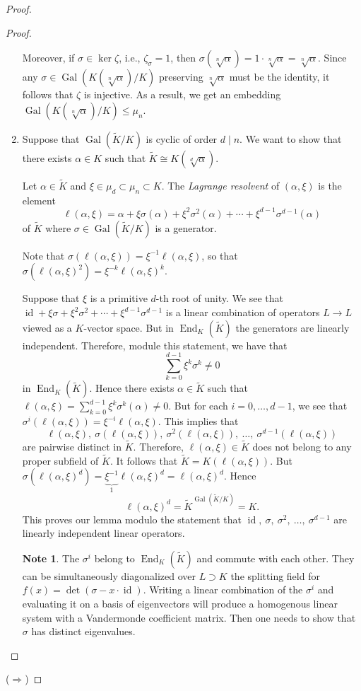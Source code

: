 \documentclass[10pt,letterpaper,cm]{nupset}
\theoremstyle{definition}
\newtheorem{note}[definition]{Note}
\theoremstyle{theorem}
\theoremstyle{remark}
\newcommand{\1}{\mathbf{1}}
\newcommand{\0}{\vec 0}
\DeclareMathOperator{\id}{id}
\DeclareMathOperator{\gal}{Gal}
\DeclareMathOperator{\ed}{End}
\begin{document}
\begin{proof}
\begin{proof}
\begin{enumerate}[label=(\alph*)]
 Moreover, if $\sigma \in \ker{\zeta}$, i.e., $\zeta_{\sigma} = 1$, then $\sigma(\sqrt[n]{\alpha}) = 1 \cdot \sqrt[n]{\alpha} = \sqrt[n]{\alpha}$. Since any $\sigma \in \gal(K(\sqrt[n]{\alpha})/K)$ preserving $\sqrt[n]{\alpha}$ must be the identity, it follows that $\zeta$ is injective. As a result, we get an embedding $\gal(K(\sqrt[n]{\alpha})/K) \leq \mu_n$.
 
\item Suppose that $\gal\left(\widetilde{K}/K\right)$ is cyclic of order $d \mid n$. We want to show that there exists $\alpha \in K$ such that $\widetilde{K} \cong K(\sqrt[d]{\alpha})$. 

Let $ \alpha \in \widetilde{K}$ and $\xi \in \mu_d \subset \mu_n \subset K$. The \textit{Lagrange resolvent} of $(\alpha, \xi)$ is the element $$ \ell(\alpha, \xi) =    \alpha + \xi \sigma(\alpha) + \xi^2 \sigma^2(\alpha) + \cdots + \xi^{d-1} \sigma^{d-1}(\alpha)$$ of $\widetilde{K}$ where $\sigma \in \gal\left(\widetilde{K}/K\right)$ is a generator. 

Note that $\sigma(\ell(\alpha, \xi)) = \xi^{-1}\ell(\alpha, \xi)$, so that $\sigma(\ell(\alpha, \xi)^2) = \xi^{-k}\ell(\alpha, \xi)^k$.

Suppose that $\xi$ is a primitive $d$-th root of unity.  We see that $\id + \xi \sigma + \xi^2 \sigma^2 + \cdots + \xi^{d-1} \sigma^{d-1}$ is a linear combination of operators $L \to L$ viewed as a $K$-vector space. But in $\ed_K\left(\widetilde{K}\right)$ the generators are linearly independent. Therefore, module this statement, we have that $$ \sum_{k=0}^{d-1} \xi^k \sigma^k  \ne 0 $$ in $\ed_K\left(\widetilde{K}\right)$. Hence there exists $\alpha \in \widetilde{K}$ such that $\ell(\alpha, \xi) = \sum_{k=0}^{d-1} \xi^k \sigma^k(\alpha) \ne 0$. But for each $i=0, \ldots, d-1$, we see that $\sigma^i(\ell(\alpha, \xi)) = \xi^{-i}\ell(\alpha, \xi)$. This implies that $$\ell(\alpha, \xi), \ \sigma(\ell(\alpha, \xi)), \ \sigma^2(\ell(\alpha, \xi)), \ \ldots, \ \sigma^{d-1}(\ell(\alpha, \xi))$$ are pairwise distinct in $\widetilde{K}$. Therefore, $\ell(\alpha, \xi) \in \widetilde{K}$ does not belong to any proper subfield of $\widetilde{K}$. It follows that $\widetilde{K} = K(\ell(\alpha, \xi))$. But $\sigma(\ell(\alpha, \xi)^d) = \underbrace{\xi^{-1}}_{1}\ell(\alpha, \xi)^d = \ell(\alpha, \xi)^d.$ Hence $$\ell(\alpha, \xi)^d = \widetilde{K}^{\gal\left(\widetilde{K}/K\right)} = K.$$This proves our lemma modulo the statement that $\id, \ \sigma, \  \sigma^2, \ \ldots , \ \sigma^{d-1}$ are linearly independent linear operators.
\begin{note}
The $\sigma^i$ belong to $\ed_K\left(\widetilde{K}\right)$ and commute with each other. They can be simultaneously diagonalized over $L \supset K$ the splitting field for $f(x) = \det(\sigma - x \cdot \id)$. Writing a linear combination of the $\sigma^i$ and evaluating it on a basis of eigenvectors will produce a homogenous linear system with a Vandermonde coefficient matrix. Then one needs to show that $\sigma$ has distinct eigenvalues. 
\end{note}
\end{enumerate}
\end{proof}
($\Longrightarrow$) 


\end{proof}
\end{document}
